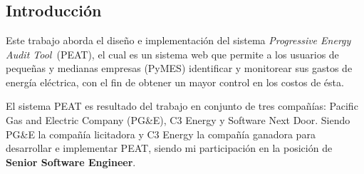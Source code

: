 \documentclass[letterpaper,twoside,openright]{book}
\begin{document}
\tableofcontents

\chapter*{}
\section*{Introducción}
Este trabajo aborda el diseño e implementación del sistema \textit{Progressive
 Energy Audit Tool}\ (PEAT), el cual es un sistema web que permite a los usuarios
de pequeñas y medianas empresas (PyMES) identificar y monitorear sus gastos
de energía eléctrica, con el fin de obtener un mayor control en los costos de ésta.

El sistema PEAT es resultado del trabajo en conjunto de tres compañías:
Pacific Gas and Electric Company (PG\&E), C3 Energy y Software Next Door.
Siendo PG\&E la compañía licitadora y C3 Energy la compañía ganadora para
desarrollar e implementar PEAT, siendo mi participación en la posición de
\textbf{Senior Software Engineer}.

\mainmatter



\backmatter
\nocite{*}


\end{document}
